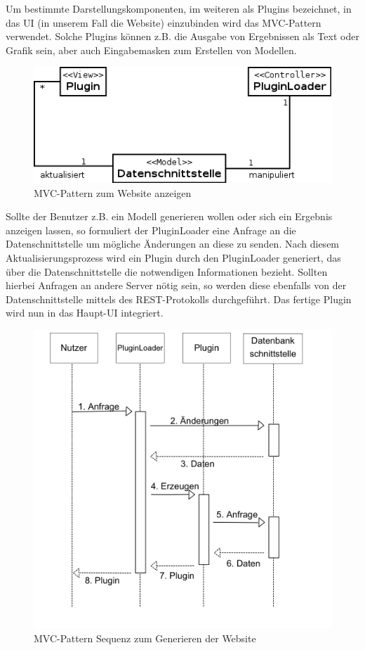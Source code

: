 Um bestimmte Darstellungskomponenten, im weiteren als Plugins bezeichnet, in das UI (in unserem Fall die Website) einzubinden wird das MVC-Pattern verwendet. Solche Plugins können z.B. die Ausgabe von Ergebnissen als Text oder Grafik sein, aber auch Eingabemasken zum Erstellen von Modellen.

\begin{figure}[h]
\centering
\includegraphics[width=0.6\linewidth]{Grafik/Diagramm/Pattern/MVC/Kontextdiagramm.png}
\caption[MVC Website Klassen]{MVC-Pattern zum Website anzeigen}
\end{figure}

\noindent Sollte der Benutzer z.B. ein Modell generieren wollen oder sich ein Ergebnis anzeigen lassen, so formuliert der PluginLoader eine Anfrage an die Datenschnittstelle um mögliche Änderungen an diese zu senden. Nach diesem Aktualisierungsprozess wird ein Plugin durch den PluginLoader generiert, das über die Datenschnittstelle die notwendigen Informationen bezieht. Sollten hierbei Anfragen an andere Server nötig sein, so werden diese ebenfalls von der Datenschnittstelle mittels des REST-Protokolls durchgeführt. 
Das fertige Plugin wird nun in das Haupt-UI integriert.

\begin{figure}[h]
\centering
\includegraphics[width=0.6\linewidth]{Grafik/Diagramm/Pattern/MVC/Sequenzdiagramm.png}
\caption[MVC Website Sequenz]{MVC-Pattern Sequenz zum Generieren der Website}
\end{figure}

